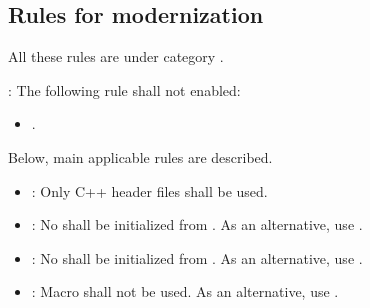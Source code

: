 \subsection{Rules for modernization}

All these rules are under category
.

: The following rule shall not enabled:
\begin{itemize}

\item {}.

\end{itemize}

Below, main applicable rules are described.

\begin{itemize}

\item {}:
Only C++ header files shall be used.

\item {}:
No  shall be initialized from .
As an alternative, use .

\item {}:
No  shall be initialized from .
As an alternative, use .

\item {}:
Macro  shall not be used.
As an alternative, use .

\end{itemize}
